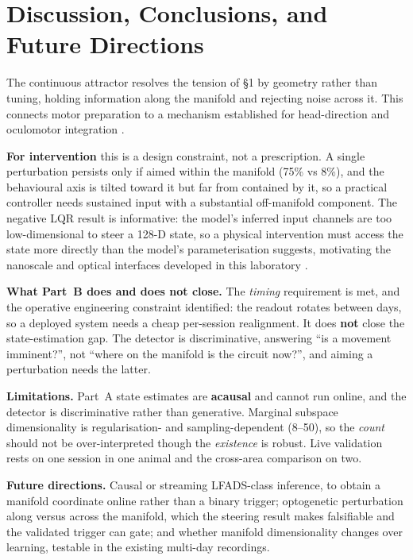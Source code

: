 \documentclass[10pt,twocolumn]{article}
\begin{document}
\section{Discussion, Conclusions, and Future Directions}

The continuous attractor resolves the tension of \S1 by geometry rather than tuning, holding information along the manifold and rejecting noise across it. This connects motor preparation to a mechanism established for head-direction and
oculomotor integration \cite{seung1996,zhang1996}.

\textbf{For intervention} this is a design constraint, not a prescription. A
single perturbation persists only if aimed within the manifold (75\% vs 8\%),
and the behavioural axis is tilted toward it but far from contained by it, so a
practical controller needs sustained input with a substantial off-manifold
component. The negative LQR result is informative: the model's inferred input
channels are too low-dimensional to steer a 128-D state, so a physical
intervention must access the state more directly than the model's
parameterisation suggests, motivating the nanoscale and optical interfaces
developed in this laboratory \cite{jayant2019,gonzales2025}.

\textbf{What Part~B does and does not close.} The \emph{timing} requirement is
met, and the operative engineering constraint identified: the readout rotates
between days, so a deployed system needs a cheap per-session realignment. It
does \textbf{not} close the state-estimation gap. The detector is discriminative,
answering ``is a movement imminent?'', not ``where on the manifold is the circuit
now?'', and aiming a perturbation needs the latter.

\textbf{Limitations.} Part~A state estimates are \textbf{acausal} and cannot run
online, and the detector is discriminative rather than generative. Marginal
subspace dimensionality is regularisation- and sampling-dependent (8--50), so the
\emph{count} should not be over-interpreted though the \emph{existence} is
robust. Live validation rests on one session in one animal and the cross-area
comparison on two.

\textbf{Future directions.} Causal or streaming LFADS-class inference, to obtain
a manifold coordinate online rather than a binary trigger; optogenetic
perturbation along versus across the manifold, which the steering result makes
falsifiable and the validated trigger can gate; and whether manifold
dimensionality changes over learning, testable in the existing multi-day
recordings.
\end{document}
